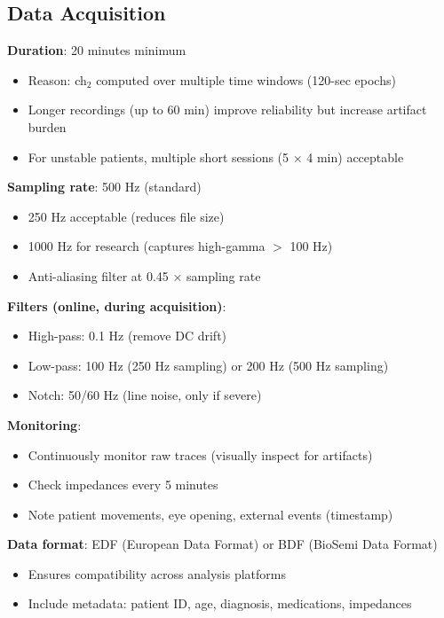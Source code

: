\subsection{Data Acquisition}

\begin{protocol}\label{prot:recording}
\textbf{Duration}: 20 minutes minimum
\begin{itemize}
\item Reason: ch$_2$ computed over multiple time windows (120-sec epochs)
\item Longer recordings (up to 60 min) improve reliability but increase artifact burden
\item For unstable patients, multiple short sessions (5 × 4 min) acceptable
\end{itemize}

\textbf{Sampling rate}: 500 Hz (standard)
\begin{itemize}
\item 250 Hz acceptable (reduces file size)
\item 1000 Hz for research (captures high-gamma $>$ 100 Hz)
\item Anti-aliasing filter at 0.45 × sampling rate
\end{itemize}

\textbf{Filters (online, during acquisition)}:
\begin{itemize}
\item High-pass: 0.1 Hz (remove DC drift)
\item Low-pass: 100 Hz (250 Hz sampling) or 200 Hz (500 Hz sampling)
\item Notch: 50/60 Hz (line noise, only if severe)
\end{itemize}

\textbf{Monitoring}:
\begin{itemize}
\item Continuously monitor raw traces (visually inspect for artifacts)
\item Check impedances every 5 minutes
\item Note patient movements, eye opening, external events (timestamp)
\end{itemize}

\textbf{Data format}: EDF (European Data Format) or BDF (BioSemi Data Format)
\begin{itemize}
\item Ensures compatibility across analysis platforms
\item Include metadata: patient ID, age, diagnosis, medications, impedances
\end{itemize}
\end{protocol}

